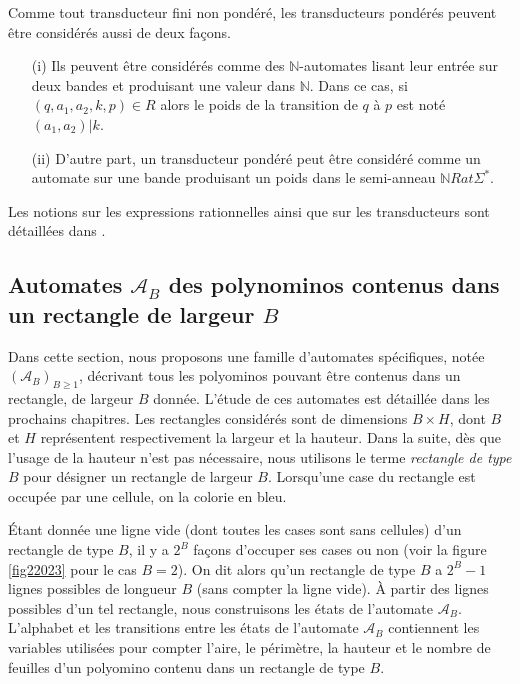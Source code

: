 Comme tout transducteur fini non pondéré, les transducteurs pondérés peuvent être considérés aussi de deux façons.
\begin{itemize}
\item[(i)] Ils peuvent être considérés comme   des $\mathbb{N}$-automates
lisant leur entrée sur deux bandes et produisant une valeur dans $\mathbb{N}$.  Dans ce cas,  si $(q, a_{1}, a_{2}, k, p)\in R$  alors le poids de la transition de $q$ à $p$ est noté $(a_{1},a_{2})|k$.
\item[(ii)] D’autre part, un transducteur pondéré peut être considéré comme un automate sur une bande produisant un poids dans le semi-anneau $\mathbb{N}Rat\Sigma^{*}$.
\end{itemize}
Les notions sur les expressions rationnelles ainsi que sur les transducteurs sont  détaillées dans \cite{Amt}.
\begin{spacing}{0.30}
\section{Automates $\mathcal{A}_{B}$ des polynominos contenus dans un rectangle de largeur $B$}
\end{spacing}

Dans  cette section, nous proposons une famille d'automates spécifiques, notée $(\mathcal{A}_{B})_{B\geq 1}$, décrivant tous les polyominos pouvant être contenus dans un rectangle, de largeur $B$ donnée. L'étude de ces automates est détaillée dans les prochains chapitres. Les rectangles considérés sont de dimensions $B\times H$, dont $B$ et $H$ représentent respectivement la largeur et la hauteur. Dans la suite, dès que l'usage de la hauteur n'est pas nécessaire, nous utilisons le terme \emph{rectangle de type} $B$ pour désigner un rectangle de largeur $B$.
Lorsqu'une case du rectangle est occupée par une cellule, on la colorie en bleu. 

Étant donnée une ligne vide (dont toutes les cases sont sans cellules) d'un rectangle de type $B$, il y a $2^{B}$ façons d'occuper ses cases ou non (voir la figure \ref{fig22023} pour le cas $B=2$). On dit alors qu'un rectangle de type $B$ a $2^{B}-1$ lignes possibles de longueur $B$ (sans compter la ligne vide). À partir des lignes possibles d'un tel rectangle, nous construisons les états de l'automate $\mathcal{A}_{B}$. L'alphabet et les transitions entre les  états de l'automate $\mathcal{A}_{B}$ contiennent les variables utilisées pour compter l'aire, le périmètre, la hauteur et le nombre de feuilles d'un polyomino contenu dans un rectangle de type $B$.

